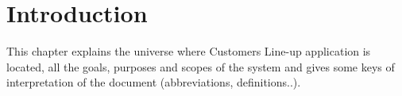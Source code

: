 \chapter{Introduction}

This chapter explains the universe where Customers Line-up application is located, all the goals, purposes and scopes of the system and gives some keys of interpretation of the document (abbreviations, definitions..).






